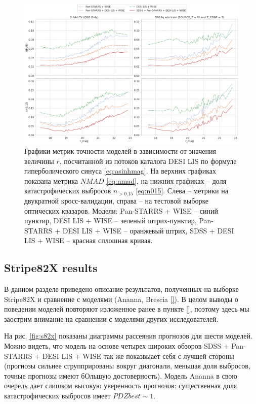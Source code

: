 \documentclass[fleqn,usenatbib]{mnras}
\begin{document}
\begin{figure}
    \centering
    \includegraphics[width=0.9\linewidth]{images/metrics-qso_r-mag.png}
    \caption{Графики метрик точности моделей в зависимости от значения величины $r$, посчитанной из потоков каталога DESI LIS по формуле гиперболического синуса \eqref{eq:asinhmag}. На верхних графиках показана метрика $NMAD$ \eqref{eq:nmad}, на нижних графиках -- доля катастрофических выбросов $n_{>0.15}$ \eqref{eq:n015}. Слева -- метрики на двукратной кросс-валидации, справа -- на тестовой выборке оптических квазаров. Модели: Pan-STARRS + WISE -- синий пунктир, DESI LIS + WISE -- зеленый штрих-пунктир, Pan-STARRS + DESI LIS + WISE -- оранжевый штрих, SDSS + DESI LIS + WISE -- красная сплошная кривая.}
    \label{fig:metrics-qso_z_mag}
\end{figure}

\subsection{Stripe82X results}\label{subsec:s82x_results}

В данном разделе приведено описание результатов, полученных на выборке Stripe82X и сравнение с моделями (Ananna, Brescia \ref{}). В целом выводы о поведении моделей повторяют изложенное ранее в пункте \ref{}, поэтому здесь мы заострим внимание на сравнении с моделями других исследователей.

На рис. \ref{fig:s82x} показаны диаграммы рассеяния прогнозов для шести моделей. Можно видеть, что модель на основе четырех широких обзоров SDSS + Pan-STARRS + DESI LIS + WISE так же показвыает себя с лучшей стороны (прогнозы сильнее сгруппрированы вокруг диагонали, меньшая доля выбросов, точные прогнозы имеют бОльшую достоверность). Модель Ananna в свою очередь дает слишком высокую уверенность прогнозов: существенная доля катастрофических выбросов имеет $PDZbest \sim 1$.
\end{document}
